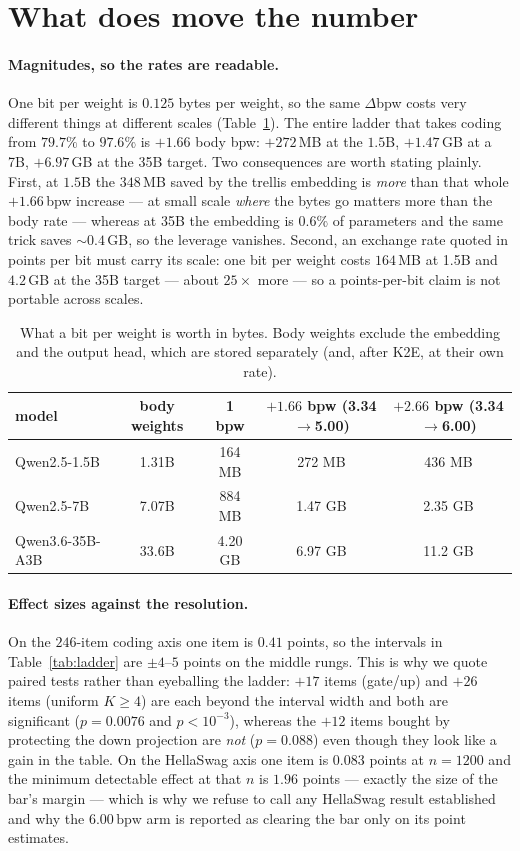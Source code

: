 \documentclass[11pt,a4paper]{article}
\newcommand{\bpw}{\,\mathrm{bpw}}
\begin{document}
\section{What does move the number}
\label{sec:moves}

\paragraph{Magnitudes, so the rates are readable.} One bit per weight is $0.125$ bytes per weight,
so the same $\Delta$bpw costs very different things at different scales (Table~\ref{tab:magnitudes}).
The entire ladder that takes coding from $79.7\%$ to $97.6\%$ is $+1.66$ body bpw: $+272$\,MB at
the $1.5$B, $+1.47$\,GB at a 7B, $+6.97$\,GB at the 35B target. Two consequences are worth stating
plainly. First, at $1.5$B the $348$\,MB saved by the trellis embedding is \emph{more} than that
whole $+1.66$\,bpw increase --- at small scale \emph{where} the bytes go matters more than the body
rate --- whereas at 35B the embedding is $0.6\%$ of parameters and the same trick saves $\sim0.4$\,GB,
so the leverage vanishes. Second, an exchange rate quoted in points per bit must carry its scale:
one bit per weight costs $164$\,MB at 1.5B and $4.2$\,GB at the 35B target --- about
$25\times$ more --- so a points-per-bit claim is not portable across scales.

\begin{table}[t]
\centering\small
\caption{What a bit per weight is worth in bytes. Body weights exclude the embedding and the
output head, which are stored separately (and, after K2E, at their own rate).}
\label{tab:magnitudes}
\begin{tabular}{lcccc}
\toprule
model & body weights & 1 bpw & $+1.66$ bpw (3.34$\to$5.00) & $+2.66$ bpw (3.34$\to$6.00)\\
\midrule
Qwen2.5-1.5B & 1.31B & 164 MB & 272 MB & 436 MB\\
Qwen2.5-7B & 7.07B & 884 MB & 1.47 GB & 2.35 GB\\
Qwen3.6-35B-A3B & 33.6B & 4.20 GB & 6.97 GB & 11.2 GB\\
\bottomrule
\end{tabular}
\end{table}

\paragraph{Effect sizes against the resolution.} On the $246$-item coding axis one item is $0.41$
points, so the intervals in Table~\ref{tab:ladder} are $\pm4$--$5$ points on the middle rungs.
This is why we quote paired tests rather than eyeballing the ladder: $+17$ items (gate/up) and
$+26$ items (uniform $K\ge4$) are each beyond the interval width and both are significant
($p=0.0076$ and $p<10^{-3}$), whereas the $+12$ items bought by protecting the down projection are
\emph{not} ($p=0.088$) even though they look like a gain in the table. On the HellaSwag axis one
item is $0.083$ points at $n=1200$ and the minimum detectable effect at that $n$ is $1.96$
points --- exactly the size of the bar's margin --- which is why we refuse to call any HellaSwag
result established and why the $6.00\bpw$ arm is reported as clearing the bar only on its point
estimates.
\end{document}
